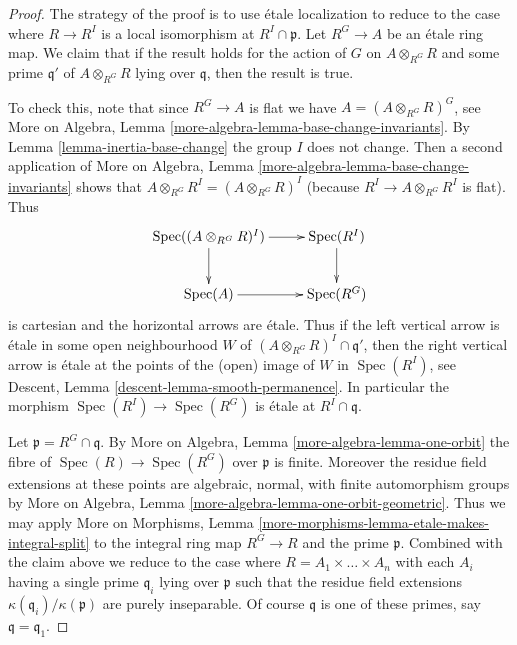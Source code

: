 \documentclass{stacks-project}
\theoremstyle{plain}
\theoremstyle{definition}
\theoremstyle{remark}
\numberwithin{equation}{subsection}
\def\Spec{\mathop{\mathrm{Spec}}}
\begin{document}
\begin{proof}
The strategy of the proof is to use \'etale localization to
reduce to the case where $R \to R^I$ is a local isomorphism at
$R^I \cap \mathfrak p$.
Let $R^G \to A$ be an \'etale ring map. We claim that if the result
holds for the action of $G$ on $A \otimes_{R^G} R$ and some prime
$\mathfrak q'$ of $A \otimes_{R^G} R$ lying over $\mathfrak q$, then
the result is true.

\medskip\noindent
To check this, note that since $R^G \to A$ is flat we have
$A = (A \otimes_{R^G} R)^G$, see More on Algebra,
Lemma \ref{more-algebra-lemma-base-change-invariants}.
By Lemma \ref{lemma-inertia-base-change} the group $I$ does not change.
Then a second application of More on Algebra,
Lemma \ref{more-algebra-lemma-base-change-invariants}
shows that $A \otimes_{R^G} R^I = (A \otimes_{R^G} R)^I$
(because $R^I \to A \otimes_{R^G} R^I$ is flat).
Thus
$$
\xymatrix{
\Spec((A \otimes_{R^G} R)^I) \ar[d] \ar[r] & \Spec(R^I) \ar[d] \\
\Spec(A) \ar[r] & \Spec(R^G)
}
$$
is cartesian and the horizontal arrows are \'etale. Thus if the
left vertical arrow is \'etale in some open neighbourhood $W$ of
$(A \otimes_{R^G} R)^I \cap \mathfrak q'$, then the right vertical
arrow is \'etale at the points of the (open) image of $W$ in
$\Spec(R^I)$, see
Descent, Lemma \ref{descent-lemma-smooth-permanence}. In particular
the morphism $\Spec(R^I) \to \Spec(R^G)$ is \'etale at $R^I \cap \mathfrak q$.

\medskip\noindent
Let $\mathfrak p = R^G \cap \mathfrak q$.
By More on Algebra, Lemma \ref{more-algebra-lemma-one-orbit}
the fibre of $\Spec(R) \to \Spec(R^G)$ over $\mathfrak p$ is
finite. Moreover the residue field extensions at these points
are algebraic, normal, with finite automorphism groups by
More on Algebra, Lemma \ref{more-algebra-lemma-one-orbit-geometric}.
Thus we may apply
More on Morphisms,
Lemma \ref{more-morphisms-lemma-etale-makes-integral-split}
to the integral ring map $R^G \to R$ and the prime $\mathfrak p$.
Combined with the claim above we reduce to the case where
$R = A_1 \times \ldots \times A_n$ with each $A_i$ having a single
prime $\mathfrak q_i$ lying over $\mathfrak p$ such that the
residue field extensions $\kappa(\mathfrak q_i)/\kappa(\mathfrak p)$
are purely inseparable. Of course $\mathfrak q$ is one of
these primes, say $\mathfrak q = \mathfrak q_1$.


\end{proof}
\end{document}
